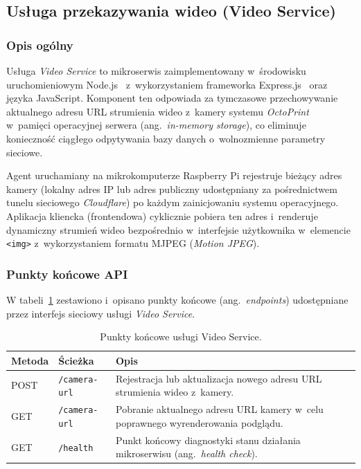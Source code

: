 \documentclass[a4paper,12pt,reqno]{article}
\begin{document}
\subsection{Usługa przekazywania wideo (Video Service)}

\subsubsection{Opis ogólny}

Usługa \textit{Video Service} to mikroserwis zaimplementowany w~środowisku uruchomieniowym Node.js~\cite{nodejs} z~wykorzystaniem frameworka Express.js~\cite{express} oraz języka JavaScript. Komponent ten odpowiada za tymczasowe przechowywanie aktualnego adresu URL strumienia wideo z~kamery systemu \textit{OctoPrint} w~pamięci operacyjnej serwera (ang.~\textit{in-memory storage}), co eliminuje konieczność ciągłego odpytywania bazy danych o~wolnozmienne parametry sieciowe.

Agent uruchamiany na mikrokomputerze Raspberry Pi rejestruje bieżący adres kamery (lokalny adres IP lub adres publiczny udostępniany za pośrednictwem tunelu sieciowego \textit{Cloudflare}) po każdym zainicjowaniu systemu operacyjnego. Aplikacja kliencka (frontendowa) cyklicznie pobiera ten adres i~renderuje dynamiczny strumień wideo bezpośrednio w~interfejsie użytkownika w~elemencie \texttt{<img>} z~wykorzystaniem formatu MJPEG (\textit{Motion JPEG}).

\subsubsection{Punkty końcowe API}

W tabeli~\ref{tab:video_endpoints} zestawiono i~opisano punkty końcowe (ang.~\textit{endpoints}) udostępniane przez interfejs sieciowy usługi \textit{Video Service}.

\begin{table}[htbp]
	\centering
	\caption{Punkty końcowe usługi Video Service.}
	\label{tab:video_endpoints}
	\begin{tabular}{llp{7cm}}
		\toprule
		\textbf{Metoda} & \textbf{Ścieżka} & \textbf{Opis} \\
		\midrule
		POST & \texttt{/camera-url} & Rejestracja lub aktualizacja nowego adresu URL strumienia wideo z~kamery. \\
		\addlinespace
		GET & \texttt{/camera-url} & Pobranie aktualnego adresu URL kamery w~celu poprawnego wyrenderowania podglądu. \\
		\addlinespace
		GET & \texttt{/health} & Punkt końcowy diagnostyki stanu działania mikroserwisu (ang.~\textit{health check}). \\
		\bottomrule
	\end{tabular}
\end{table}
\end{document}
